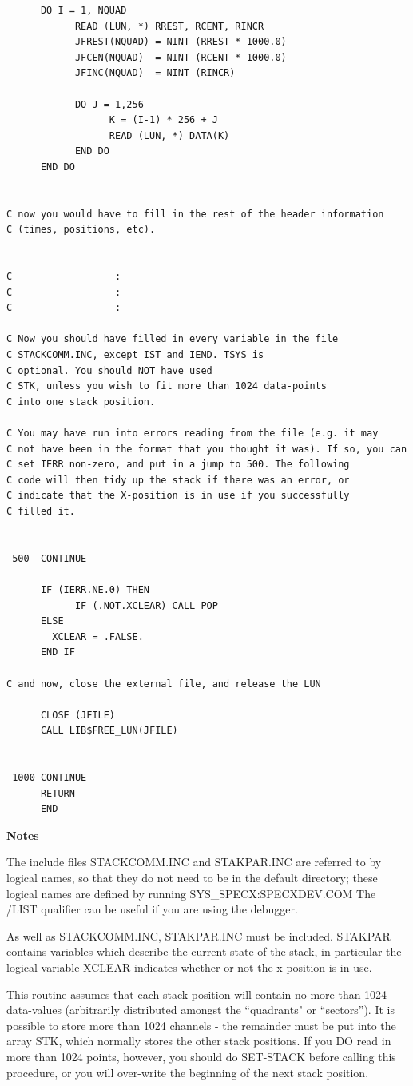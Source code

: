 \documentclass[11pt,twoside]{report}
\begin{document}
\begin{verbatim}
      DO I = 1, NQUAD
            READ (LUN, *) RREST, RCENT, RINCR
            JFREST(NQUAD) = NINT (RREST * 1000.0)
            JFCEN(NQUAD)  = NINT (RCENT * 1000.0)
            JFINC(NQUAD)  = NINT (RINCR)

            DO J = 1,256
                  K = (I-1) * 256 + J
                  READ (LUN, *) DATA(K)
            END DO
      END DO
      

C now you would have to fill in the rest of the header information
C (times, positions, etc).


C                  :
C                  :
C                  :

C Now you should have filled in every variable in the file
C STACKCOMM.INC, except IST and IEND. TSYS is
C optional. You should NOT have used
C STK, unless you wish to fit more than 1024 data-points
C into one stack position.

C You may have run into errors reading from the file (e.g. it may
C not have been in the format that you thought it was). If so, you can
C set IERR non-zero, and put in a jump to 500. The following
C code will then tidy up the stack if there was an error, or
C indicate that the X-position is in use if you successfully
C filled it.


 500  CONTINUE
      
      IF (IERR.NE.0) THEN
            IF (.NOT.XCLEAR) CALL POP
      ELSE
        XCLEAR = .FALSE.
      END IF

C and now, close the external file, and release the LUN

      CLOSE (JFILE)
      CALL LIB$FREE_LUN(JFILE)


 1000 CONTINUE
      RETURN
      END
\end{verbatim}

{\Large{\bf Notes}}

The include files STACKCOMM.INC and STAKPAR.INC are referred to by
logical names, so that they do not need to be in the default
directory; these logical names are defined by running
SYS\_SPECX:SPECXDEV.COM The /LIST qualifier can be useful if you are
using the debugger. 

As well as STACKCOMM.INC, STAKPAR.INC must be included. STAKPAR
contains variables which describe the current state of the stack, in
particular the logical variable XCLEAR indicates whether or not the
x-position is in use. 

This routine assumes that each stack position will contain no more than 1024
data-values (arbitrarily distributed amongst the ``quadrants" or ``sectors'').
It is possible to store more than 1024 channels - the remainder must be put
into the array STK, which normally stores the other stack positions. If you DO
read in more than 1024 points, however, you should do SET-STACK before calling
this procedure, or you will over-write the beginning of the next stack
position. 
\end{document}
